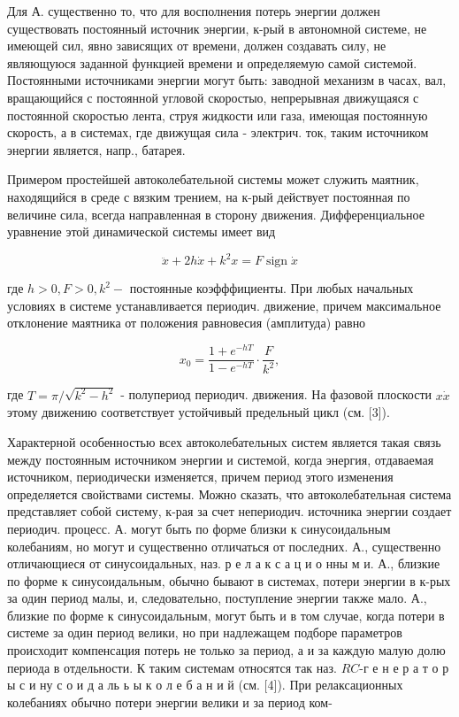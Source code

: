 \documentclass[10pt]{article}
\begin{document}
Для А. существенно то, что для восполнения потерь энергии должен существовать постоянный источник энергии, к-рый в автономной системе, не имеющей сил, явно зависящих от времени, должен создавать силу, не являющуюся заданной функцией времени и определяемую самой системой. Постоянными источниками энергии могут быть: заводной механизм в часах, вал, вращающийся с постоянной угловой скоростыо, непрерывная движущаяся с постоянной скоростью лента, струя жидкости или газа, имеющая постоянную скорость, а в системах, где движущая сила - электрич. ток, таким источником энергии является, напр., батарея.



Примером простейшей автоколебательной системы может служить маятник, находящийся в среде с вязким трением, на к-рый действует постоянная по величине сила, всегда направленная в сторону движения. Дифференциальное уравнение этой динамической системы имеет вид



\[

\ddot{x}+2 h \dot{x}+k^{2} x=F \operatorname{sign} \dot{x}

\]



где $h>0, F>0, k^{2}-$ постоянные коэфффициенты. При любых начальных условиях в системе устанавливается периодич. движение, причем максимальное отклонение маятника от положения равновесия (амплитуда) равно



\[

x_{0}=\frac{1+e^{-h T}}{1-e^{-h T}} \cdot \frac{F}{k^{2}},

\]



где $T=\pi / \sqrt{k^{2}-h^{2}}$ - полупериод периодич. движения. На фазовой плоскости $x \dot{x}$ этому движению соответствует устойчивый предельный цикл (см. [3]).



Характерной особенностью всех автоколебательных систем является такая связь между постоянным источником энергии и системой, когда энергия, отдаваемая источником, периодически изменяется, причем период этого изменения определяется свойствами системы. Можно сказать, что автоколебательная система представляет собой систему, к-рая за счет непериодич. источника энергии создает периодич. процесс. А. могут быть по форме близки к синусоидальным колебаниям, но могут и существенно отличаться от последних. А., существенно отличающиеся от синусоидальных, наз. р е л а к с а ц и о нны м и. А., близкие по форме к синусоидальным, обычно бывают в системах, потери энергии в к-рых за один период малы, и, следовательно, поступление энергии также мало. А., близкие по форме к синусоидальным, могут быть и в том случае, когда потери в системе за один период велики, но при надлежащем подборе параметров происходит компенсация потерь не только за период, а и за каждую малую долю периода в отдельности. $К$ таким системам относятся так наз. $R C$-г е н е р а т о р ы с и ну с о и д а ль ь ы к о л е б а н и й (см. [4]). При релаксационных колебаниях обычно потери энергии велики и за период ком-
\end{document}
